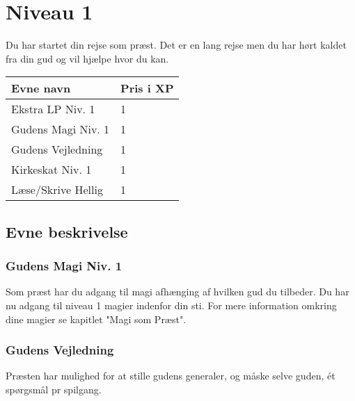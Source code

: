 \chapter*{Niveau 1}
Du har startet din rejse som præst. Det er en lang rejse men du har hørt kaldet fra din gud og vil hjælpe hvor du kan.

\begin{table}[H]
    \centering
    \begin{tabular}{|p{}|p{}|}
    \rowcolor{cerulean!80}\hline
        Evne navn & Pris i XP \\\hline
            Ekstra LP Niv. 1 & 1 \\\hline
            Gudens Magi Niv. 1 & 1 \\\hline
            Gudens Vejledning & 1 \\\hline
            Kirkeskat Niv. 1 & 1 \\\hline
            Læse/Skrive Hellig & 1 \\\hline
    \end{tabular}
\end{table}

\section*{Evne beskrivelse}



\subsection*{Gudens Magi Niv. 1}
Som præst har du adgang til magi afhænging af hvilken gud du tilbeder. Du har nu adgang til niveau 1 magier indenfor din sti. For mere information omkring dine magier se kapitlet "Magi som Præst".

\subsection*{Gudens Vejledning}
Præsten har mulighed for at stille gudens generaler, og måske selve guden, ét spørgsmål pr spilgang.




